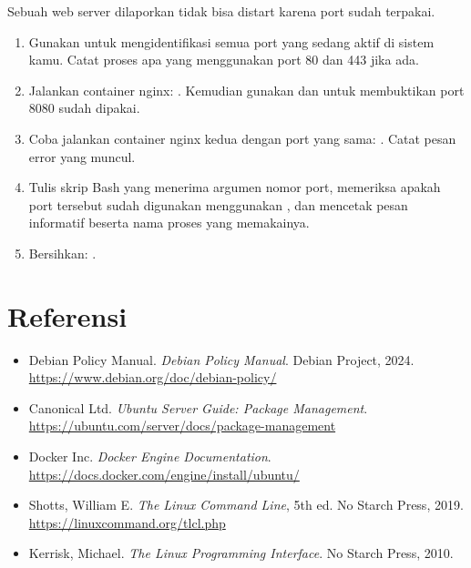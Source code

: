 \begin{exercisebox}
Sebuah web server dilaporkan tidak bisa distart karena port sudah terpakai.
\begin{enumerate}
    \item Gunakan  untuk mengidentifikasi semua port yang sedang
        aktif di sistem kamu. Catat proses apa yang menggunakan port 80 dan 443
        jika ada.
    \item Jalankan container nginx: . Kemudian gunakan  dan  untuk membuktikan port 8080 sudah dipakai.
    \item Coba jalankan container nginx kedua dengan port yang sama:
        .
        Catat pesan error yang muncul.
    \item Tulis skrip Bash  yang menerima argumen nomor port,
        memeriksa apakah port tersebut sudah digunakan menggunakan ,
        dan mencetak pesan informatif beserta nama proses yang memakainya.
    \item Bersihkan: .
\end{enumerate}
\end{exercisebox}

\section{Referensi}
\label{sec:appmanagement-references}

\begin{itemize}
    \item Debian Policy Manual. \textit{Debian Policy Manual}. Debian Project, 2024.
        \url{https://www.debian.org/doc/debian-policy/}
    \item Canonical Ltd. \textit{Ubuntu Server Guide: Package Management}.
        \url{https://ubuntu.com/server/docs/package-management}
    \item Docker Inc. \textit{Docker Engine Documentation}.
        \url{https://docs.docker.com/engine/install/ubuntu/}
    \item Shotts, William E. \textit{The Linux Command Line}, 5th ed.
        No Starch Press, 2019. \url{https://linuxcommand.org/tlcl.php}
    \item Kerrisk, Michael. \textit{The Linux Programming Interface}.
        No Starch Press, 2010.
\end{itemize}
